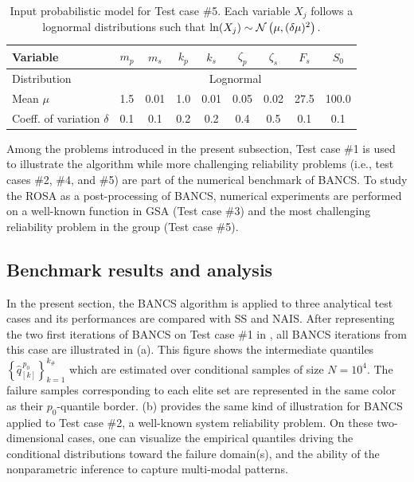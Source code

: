 \begin{table}[h]
\centering
\caption{Input probabilistic model for Test case \#5. Each variable $X_j$ follows a lognormal distributions such that $\mathrm{ln}(X_j)\sim \mathcal{N}\left(\mu, (\delta \mu)^2 \right)$.}
\begin{tabular}{ lcccccccc }
    \hline
    Variable                     & $m_p$ & $m_s$ & $k_p$ & $k_s$ & $\zeta_p$ & $\zeta_s$ & $F_s$ & $S_0$ \\
    \hline          
    Distribution                 &  \multicolumn{8}{c}{Lognormal} \\ 
    Mean $\mu$                   & 1.5 & 0.01 & 1.0 & 0.01 & 0.05 & 0.02 & 27.5 & 100.0\\ 
    Coeff. of variation $\delta$ & 0.1 & 0.1 & 0.2 & 0.2 & 0.4 & 0.5 & 0.1 & 0.1\\
    \hline
\end{tabular}
\label{tab:oscillator}
\end{table}

Among the problems introduced in the present subsection, Test case \#1 is used to illustrate the algorithm while more challenging reliability problems (i.e., test cases \#2, \#4, and \#5) are part of the numerical benchmark of BANCS. 
To study the ROSA as a post-processing of BANCS, numerical experiments are performed on a well-known function in GSA (Test case \#3) and the most challenging reliability problem in the group (Test case \#5). 

\subsection{Benchmark results and analysis}

In the present section, the BANCS algorithm is applied to three analytical test cases and its performances are compared with SS and NAIS. 
After representing the two first iterations of BANCS on Test case \#1 in , all BANCS iterations from this case are illustrated in  (a). 
This figure shows the intermediate quantiles $\left\{\widehat{q}_{[k]}^{\, p_0}\right\}_{k=1}^{k_\#}$ which are estimated over conditional samples of size $N=10^4$. 
The failure samples corresponding to each elite set are represented in the same color as their $p_0$-quantile border. 
 (b) provides the same kind of illustration for BANCS applied to Test case \#2, a well-known system reliability problem. 
On these two-dimensional cases, one can visualize the empirical quantiles driving the conditional distributions toward the failure domain(s), and the ability of the nonparametric inference to capture multi-modal patterns.  

